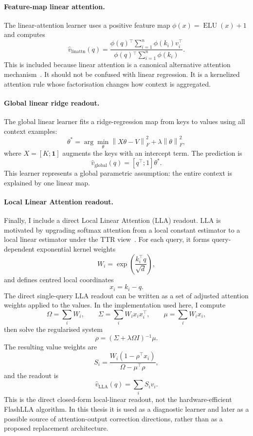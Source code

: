 \paragraph{Feature-map linear attention.}
The linear-attention learner uses a positive feature map \(\phi(x)=\operatorname{ELU}(x)+1\) and computes
\[
\hat v_{\mathrm{linattn}}(q)
=
\frac{
\phi(q){}^\top \sum_{i=1}^{n}\phi(k_i)v_i^\top
}{
\phi(q){}^\top \sum_{i=1}^{n}\phi(k_i)
}.
\]
This is included because linear attention is a canonical alternative attention mechanism~\cite{katharopoulos2020transformers}. It should not be confused with linear regression. It is a kernelized attention rule whose factorisation changes how context is aggregated.

\paragraph{Global linear ridge readout.}
The global linear learner fits a ridge-regression map from keys to values using all context examples:
\[
\theta^*
=
\arg\min_{\theta}
\left\lVert X\theta - V \right\rVert_F^2
+
\lambda \left\lVert \theta \right\rVert_F^2,
\]
where \(X=[K ; \mathbf{1}]\) augments the keys with an intercept term. The prediction is
\[
\hat v_{\mathrm{global}}(q)
=
[q^\top ; 1]\theta^* .
\]
This learner represents a global parametric assumption: the entire context is explained by one linear map.

\paragraph{Local Linear Attention readout.}
Finally, I include a direct Local Linear Attention (LLA) readout. LLA is motivated by upgrading softmax attention from a local constant estimator to a local linear estimator under the TTR view~\cite{zuo2025local}. For each query, it forms query-dependent exponential kernel weights
\[
W_i = \exp\left(\frac{k_i^\top q}{\sqrt{d}}\right),
\]
and defines centred local coordinates
\[
x_i = k_i - q .
\]
The direct single-query LLA readout can be written as a set of adjusted attention weights applied to the values. In the implementation used here, I compute
\[
\Omega = \sum_i W_i,
\qquad
\Sigma = \sum_i W_i x_i x_i^\top,
\qquad
\mu = \sum_i W_i x_i,
\]
then solve the regularised system
\[
\rho
=
\left(\Sigma + \lambda \Omega I\right){}^{-1}\mu .
\]
The resulting value weights are
\[
S_i
=
\frac{
W_i \left(1 - \rho^\top x_i\right)
}{
\Omega - \mu^\top \rho
},
\]
and the readout is
\[
\hat v_{\mathrm{LLA}}(q)
=
\sum_i S_i v_i .
\]
This is the direct closed-form local-linear readout, not the hardware-efficient FlashLLA algorithm. In this thesis it is used as a diagnostic learner and later as a possible source of attention-output correction directions, rather than as a proposed replacement architecture.

